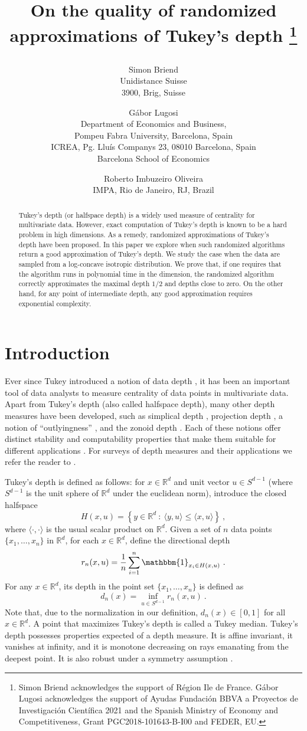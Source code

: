 \documentclass[12pt]{article}
\title{On the quality of randomized approximations of Tukey's depth
    \thanks{Simon Briend acknowledges the support of Région Ile de France.
G\'abor Lugosi acknowledges the support of Ayudas Fundación BBVA a
Proyectos de Investigación Científica 2021 and
the Spanish Ministry of Economy and Competitiveness, Grant
PGC2018-101643-B-I00 and FEDER, EU.}
\author{
  Simon Briend \\
  Unidistance Suisse\\
  3900, Brig, Suisse 
\and  
G\'abor Lugosi \\
Department of Economics and Business, \\
Pompeu  Fabra University, Barcelona, Spain \\
ICREA, Pg. Lluís Companys 23, 08010 Barcelona, Spain \\
Barcelona School of Economics
\and
Roberto Imbuzeiro Oliveira \\
IMPA, Rio de Janeiro, RJ, Brazil
}
}
\date{}
\newcommand{\R}{\mathbb{R}}
\def\IND{\mathbbm{1}}
\begin{document}
\maketitle


\begin{abstract}
Tukey's depth (or halfspace depth) is a widely used measure of centrality for multivariate data. However, exact computation of Tukey's depth is known to be a hard problem in high dimensions. As a remedy, randomized approximations of Tukey's depth have been proposed. In this paper we explore when such randomized algorithms return a good approximation of Tukey's depth. We study the case when the data are sampled from a log-concave isotropic distribution. We prove that, if one requires that the algorithm runs in polynomial time in the dimension, the randomized algorithm correctly approximates the maximal depth $1/2$ and depths close to zero. On the other hand, for any point of intermediate depth, any good approximation requires exponential complexity.
\end{abstract}





\section{Introduction}
\label{sec:intro}

Ever since Tukey introduced a notion of data depth \cite{10029477185},
it has been an important tool of data analysts to measure centrality of data points
in multivariate data. Apart from Tukey's depth (also called halfspace depth), many other depth measures
have been developed, such as simplical depth \cite{liu1988notion,liu1990notion},
projection depth \cite{Liu92,ZuSe00},
a notion of ``outlyingness'' \cite{Sta81,Don82}, and the zonoid depth \cite{DyMoKo96,koshevoy1997zonoid}.
Each of these notions offer distinct stability and computability properties that make them suitable for different applications \cite{mosler2021choosing}.  For surveys of depth measures and their  applications we refer the reader to \cite{Mos02,Alo06,dyckerhoff2016exact,rousseeuw1999depth,NaScWe19}. 

Tukey's depth is defined as follows: for $x\in \R^d$ and unit vector $u\in S^{d-1}$ (where $S^{d-1}$ is the unit sphere of $\R^d$ under the euclidean norm), introduce the closed halfspace
\[
  H(x,u) = \left\{ y \in \R^d \ : \ \langle y,u\rangle \leq \langle x,u\rangle \right\}~,
\]
where $\langle \cdot,\cdot\rangle$ is the usual scalar product on $\R^d$. Given a set of $n$ data points $\{x_1,\ldots,x_n\}$ in $\R^d$, for each $x\in \R^d$, define the directional depth
\[
  r_n(x,u) = \frac{1}{n}\sum_{i=1}^n \IND_{x_i\in H(x,u)}~.
\]
For any $x\in\R^d$, its depth  in the point set $\{x_1,\ldots,x_n\}$ is defined as
\[
  d_n(x) = \inf_{u\in S^{d-1}} r_n(x,u)~.
\]
Note that, due to the normalization in our definition, $d_n(x)\in [0,1]$ for all $x\in \R^d$. A point that maximizes Tukey's depth is called a Tukey median.
Tukey's depth possesses properties expected of a depth measure. It is affine invariant, it vanishes at infinity, and it is monotone decreasing on rays emanating from the deepest point. It is also robust under a symmetry assumption  \cite{DoGa92}.
\end{document}
